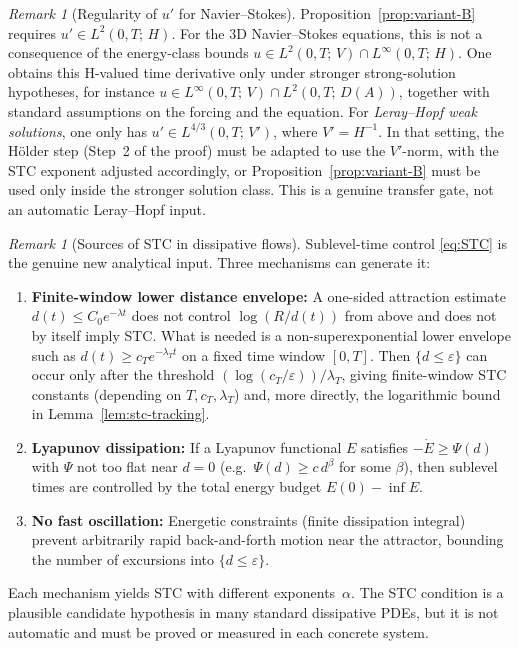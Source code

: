 \documentclass[12pt,a4paper]{article}
\theoremstyle{definition}
\theoremstyle{plain}
\theoremstyle{remark}
\newtheorem{remark}[definition]{Remark}
\begin{document}
\begin{remark}[Regularity of $u'$ for Navier--Stokes]
\label{rem:uprime-regularity}
Proposition~\ref{prop:variant-B} requires
$u' \in L^2(0,T;\,H)$.  For the 3D Navier--Stokes equations,
this is not a consequence of the energy-class bounds
$u \in L^2(0,T;\,V) \cap L^\infty(0,T;\,H)$.  One obtains this
H-valued time derivative only under stronger strong-solution
hypotheses, for instance
$u \in L^\infty(0,T;\,V)\cap L^2(0,T;\,D(A))$, together with
standard assumptions on the forcing and the equation.  For
\emph{Leray--Hopf weak solutions}, one only has
$u' \in L^{4/3}(0,T;\,V')$, where $V' = H^{-1}$.  In that
setting, the Hölder step (Step~2 of the proof) must be
adapted to use the $V'$-norm, with the STC exponent adjusted
accordingly, or Proposition~\ref{prop:variant-B} must be used only
inside the stronger solution class.  This is a genuine transfer gate,
not an automatic Leray--Hopf input.
\end{remark}

\begin{remark}[Sources of STC in dissipative flows]
\label{rem:STC-sources}
Sublevel-time control \eqref{eq:STC} is the genuine new
analytical input.  Three mechanisms can generate it:

\begin{enumerate}[label=(\roman*)]
  \item \textbf{Finite-window lower distance envelope:}\;
    A one-sided attraction estimate $d(t)\le C_0 e^{-\lambda t}$
    does not control $\log(R/d(t))$ from above and does not by
    itself imply STC.  What is needed is a non-superexponential
    lower envelope such as
    $d(t)\ge c_T e^{-\lambda_T t}$ on a fixed time window $[0,T]$.
    Then $\{d\le\varepsilon\}$ can occur only after the threshold
    $(\log(c_T/\varepsilon))/\lambda_T$, giving finite-window STC
    constants (depending on $T,c_T,\lambda_T$) and, more directly,
    the logarithmic bound in Lemma~\ref{lem:stc-tracking}.
  \item \textbf{Lyapunov dissipation:}\;
    If a Lyapunov functional $E$ satisfies
    $-\dot{E} \ge \Psi(d)$ with $\Psi$ not too flat near $d=0$
    (e.g.\ $\Psi(d) \ge c\,d^\beta$ for some $\beta$),
    then sublevel times are controlled by the total energy budget
    $E(0) - \inf E$.
  \item \textbf{No fast oscillation:}\;
    Energetic constraints (finite dissipation integral)
    prevent arbitrarily rapid back-and-forth motion near the
    attractor, bounding the number of excursions into
    $\{d \le \varepsilon\}$.
\end{enumerate}
Each mechanism yields STC with different exponents~$\alpha$.
The STC condition is a plausible candidate hypothesis in many
standard dissipative PDEs, but it is not automatic and must be
proved or measured in each concrete system.
\end{remark}
\end{document}
